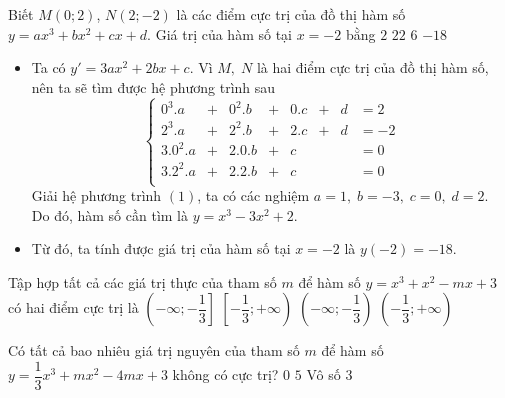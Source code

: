 \begin{ex}%
    Biết $M(0;2)$, $N(2;-2)$ là các điểm cực trị của đồ thị hàm số $y=a x^3+b x^2+c x+d$. Giá trị của hàm số tại $x=-2$ bằng
    \choice
    {$2$}
    {$22$}
    {$6$}
    {\True $-18$}
    \loigiai
    {
        \begin{itemize}
            \item Ta có $y' = 3ax^2 + 2bx + c$.
            Vì $M, \; N$ là hai điểm cực trị của đồ thị hàm số, nên ta sẽ tìm được hệ phương trình sau
            \[\left\{
            \begin{array}{rlrlrlll}
                0^3.a & +& 0^2.b & +& 0.c & +& d & = 2\\
                2^3.a & +& 2^2.b & +& 2.c & +& d & = -2\\
                3.0^2.a & +& 2.0.b & +& c & & & = 0\\
                3.2^2.a & +& 2.2.b & +& c & & & = 0\\
            \end{array}
            \right. \tag{1} \]
            Giải hệ phương trình $(1)$, ta có các nghiệm $a= 1, \; b=-3, \; c=0, \; d=2$.\\
            Do đó, hàm số cần tìm là $y=x^3 - 3x^2 + 2$.
            \item Từ đó, ta tính được giá trị của hàm số tại $x=-2$ là $y(-2)=-18$.
        \end{itemize}
    }
\end{ex}
\begin{ex}%
    Tập hợp tất cả các giá trị thực của tham số $ m $ để hàm số $ y=x^3+x^2-mx+3 $ có hai điểm cực trị là
    \choice
    {$\left(-\infty;-\dfrac{1}{3}\right]$}
    {$\left[-\dfrac{1}{3};+\infty \right)$}
    {$\left(-\infty;-\dfrac{1}{3}\right)$}
    {\True $\left(-\dfrac{1}{3};+\infty\right)$}
\end{ex}
\begin{ex}%
    Có tất cả bao nhiêu giá trị nguyên của tham số $ m $ để hàm số $ y=\dfrac{1}{3}x^3+mx^2-4mx+3 $ không có cực trị?
    \choice
    {$0$}
    {\True $5$}
    {Vô số}
    {$3$}
\end{ex}
